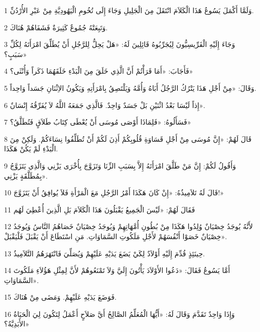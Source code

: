\par 1 وَلَمَّا أَكْمَلَ يَسُوعُ هَذَا الْكَلاَمَ انْتَقَلَ مِنَ الْجَلِيلِ وَجَاءَ إِلَى تُخُومِ الْيَهُودِيَّةِ مِنْ عَبْرِ الأُرْدُنِّ.
\par 2 وَتَبِعَتْهُ جُمُوعٌ كَثِيرَةٌ فَشَفَاهُمْ هُنَاكَ.
\par 3 وَجَاءَ إِلَيْهِ الْفَرِّيسِيُّونَ لِيُجَرِّبُوهُ قَائِلِينَ لَهُ: «هَلْ يَحِلُّ لِلرَّجُلِ أَنْ يُطَلِّقَ امْرَأَتَهُ لِكُلِّ سَبَبٍ؟»
\par 4 فَأَجَابَ: «أَمَا قَرَأْتُمْ أَنَّ الَّذِي خَلَقَ مِنَ الْبَدْءِ خَلَقَهُمَا ذَكَراً وَأُنْثَى؟»
\par 5 وَقَالَ: «مِنْ أَجْلِ هَذَا يَتْرُكُ الرَّجُلُ أَبَاهُ وَأُمَّهُ وَيَلْتَصِقُ بِامْرَأَتِهِ وَيَكُونُ الاِثْنَانِ جَسَداً وَاحِداً.
\par 6 إِذاً لَيْسَا بَعْدُ اثْنَيْنِ بَلْ جَسَدٌ وَاحِدٌ. فَالَّذِي جَمَعَهُ اللَّهُ لاَ يُفَرِّقُهُ إِنْسَانٌ».
\par 7 فَسَأَلُوهُ: «فَلِمَاذَا أَوْصَى مُوسَى أَنْ يُعْطَى كِتَابُ طَلاَقٍ فَتُطَلَّقُ؟»
\par 8 قَالَ لَهُمْ: «إِنَّ مُوسَى مِنْ أَجْلِ قَسَاوَةِ قُلُوبِكُمْ أَذِنَ لَكُمْ أَنْ تُطَلِّقُوا نِسَاءَكُمْ. وَلَكِنْ مِنَ الْبَدْءِ لَمْ يَكُنْ هَكَذَا.
\par 9 وَأَقُولُ لَكُمْ: إِنَّ مَنْ طَلَّقَ امْرَأَتَهُ إِلاَّ بِسَبَبِ الزِّنَا وَتَزَوَّجَ بِأُخْرَى يَزْنِي وَالَّذِي يَتَزَوَّجُ بِمُطَلَّقَةٍ يَزْنِي».
\par 10 قَالَ لَهُ تَلاَمِيذُهُ: «إِنْ كَانَ هَكَذَا أَمْرُ الرَّجُلِ مَعَ الْمَرْأَةِ فَلاَ يُوافِقُ أَنْ يَتَزَوَّجَ!»
\par 11 فَقَالَ لَهُمْ: «لَيْسَ الْجَمِيعُ يَقْبَلُونَ هَذَا الْكَلاَمَ بَلِ الَّذِينَ أُعْطِيَ لَهُم
\par 12 لأَنَّهُ يُوجَدُ خِصْيَانٌ وُلِدُوا هَكَذَا مِنْ بُطُونِ أُمَّهَاتِهِمْ وَيُوجَدُ خِصْيَانٌ خَصَاهُمُ النَّاسُ وَيُوجَدُ خِصْيَانٌ خَصَوْا أَنْفُسَهُمْ لأَجْلِ مَلَكُوتِ السَّمَاوَاتِ. مَنِ اسْتَطَاعَ أَنْ يَقْبَلَ فَلْيَقْبَلْ».
\par 13 حِينَئِذٍ قُدِّمَ إِلَيْهِ أَوْلاَدٌ لِكَيْ يَضَعَ يَدَيْهِ عَلَيْهِمْ وَيُصَلِّيَ فَانْتَهَرَهُمُ التَّلاَمِيذُ.
\par 14 أَمَّا يَسُوعُ فَقَالَ: «دَعُوا الأَوْلاَدَ يَأْتُونَ إِلَيَّ وَلاَ تَمْنَعُوهُمْ لأَنَّ لِمِثْلِ هَؤُلاَءِ مَلَكُوتَ السَّمَاوَاتِ».
\par 15 فَوَضَعَ يَدَيْهِ عَلَيْهِمْ. وَمَضَى مِنْ هُنَاكَ.
\par 16 وَإِذَا وَاحِدٌ تَقَدَّمَ وَقَالَ لَهُ: «أَيُّهَا الْمُعَلِّمُ الصَّالِحُ أَيَّ صَلاَحٍ أَعْمَلُ لِتَكُونَ لِيَ الْحَيَاةُ الأَبَدِيَّةُ؟»

